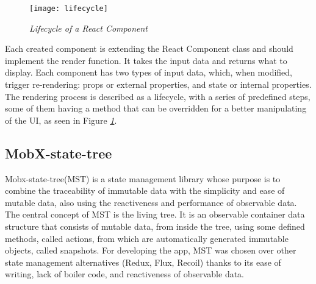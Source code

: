 \begin{figure}[H]
  \centering
  \texttt{[image: lifecycle]}
  \caption{\emph{Lifecycle of a React Component}}
  \label{fig:lifecycle}
\end{figure}

Each created component is extending the React Component class
and should implement the render function.
It takes the input data and returns what to display.
Each component has two types of input data, which, when modified,
trigger re-rendering: props or external properties, and state or internal properties.
The rendering process is described as a lifecycle,
with a series of predefined steps,
some of them having a method that can be overridden
for a better manipulating of the UI, as seen in Figure \emph{\ref{fig:lifecycle}}.

\subsection{MobX-state-tree}
Mobx-state-tree(MST) is a state management library whose purpose
is to combine the traceability of immutable data with the simplicity
and ease of mutable data, also using the reactiveness
and performance of observable data.
The central concept of MST is the living tree.
It is an observable container data structure that consists of mutable data,
from inside the tree, using some defined methods, called actions,
from which are automatically generated immutable objects, called snapshots.
For developing the app, MST was chosen over other state management alternatives
(Redux, Flux, Recoil) thanks to its ease of writing,
lack of boiler code, and reactiveness of observable data.


